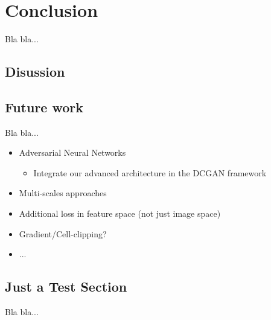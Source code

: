 
\chapter{Conclusion} \label{chapter:conclusion}

Bla bla...


\section{Disussion}




\section{Future work}



Bla bla...

\begin{itemize}
\item Adversarial Neural Networks
	\begin{itemize}
	\item Integrate our advanced architecture in the DCGAN framework
	\end{itemize}
\item Multi-scales approaches
\item Additional loss in feature space (not just image space)
\item Gradient/Cell-clipping?
\item ...
\end{itemize}

\section{Just a Test Section}

Bla bla...

